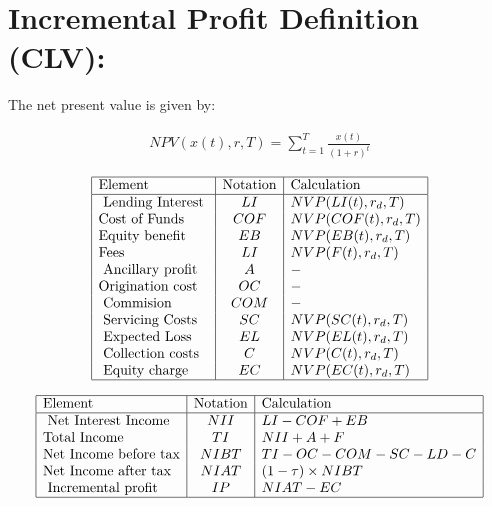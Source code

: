 \documentclass[12pt]{book}
\begin{document}
\section{ Incremental Profit Definition (CLV): }
The net present value is given by:

\begin{align}
NPV(x(t),r,T)=\sum_{t=1}^T \frac{x(t)}{(1+r)^t}
\end{align}

\renewcommand{\arraystretch}{1.5} %
\begin{center} %
\[ %
\begin{array}{|l|c|l|} \hline %
\mbox{Element} & \mbox{Notation} & \mbox{Calculation}\\ \hline
\mbox{ Lending Interest }  & LI & NVP(LI(t),r_d,T)\\
\mbox{Cost of Funds   }  & COF & NVP(COF(t),r_d,T)\\
\mbox{Equity benefit }  & EB & NVP(EB(t),r_d,T)\\
\mbox{Fees }  & LI & NVP(F(t),r_d,T)\\
\mbox{ Ancillary profit }  & A & -\\
\mbox{Origination cost}  & OC & -\\
\mbox{ Commision  }  & COM & -\\
\mbox{ Servicing Costs}  & SC & NVP(SC(t),r_d,T)\\
\mbox{ Expected Loss }  & EL & NVP(EL(t),r_d,T)\\
\mbox{ Collection costs }  & C & NVP(C(t),r_d,T)\\
\mbox{ Equity charge}  & EC & NVP(EC(t),r_d,T)\\

\hline
\end{array} %
\] %
\end{center}

\renewcommand{\arraystretch}{1.5} %
\begin{center} %
\[ %
\begin{array}{|l|c|l|} \hline %
\mbox{Element} & \mbox{Notation} & \mbox{Calculation}\\ \hline
\mbox{ Net Interest Income }  & NII & LI-COF+EB\\
\mbox{Total Income  }  & TI & NII+A+F\\
\mbox{Net Income before tax}  & NIBT & TI-OC-COM-SC-LD-C\\
\mbox{Net Income after tax }  & NIAT&(1-\tau)\times NIBT \\
\mbox{ Incremental profit  }  & IP & NIAT-EC\\

\hline
\end{array} %
\] %
\end{center}
\end{document}
